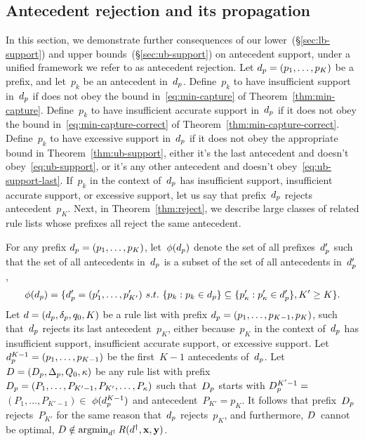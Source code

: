 \begin{arxiv}
\subsection{Antecedent rejection and its propagation}
\label{sec:reject}

In this section, we demonstrate further consequences of
our lower~(\S\ref{sec:lb-support}) and upper
bounds~(\S\ref{sec:ub-support}) on antecedent support,
under a unified framework we refer to as antecedent rejection.
%
Let ${d_p = (p_1, \dots, p_K)}$ be a prefix,
and let~$p_k$ be an antecedent in~$d_p$.
%
Define~$p_k$ to have insufficient support in~$d_p$
if does not obey the bound in~\eqref{eq:min-capture}
of Theorem~\ref{thm:min-capture}.
%
Define~$p_k$ to have insufficient accurate support in~$d_p$
if it does not obey the bound in~\eqref{eq:min-capture-correct}
of Theorem~\ref{thm:min-capture-correct}.
%
Define~$p_k$ to have excessive support in~$d_p$ if it
does not obey the appropriate bound in Theorem~\ref{thm:ub-support},
\ie either it's the last antecedent and doesn't obey~\eqref{eq:ub-support},
or it's any other antecedent and doesn't obey~\eqref{eq:ub-support-last}.
%
If~$p_k$ in the context of~$d_p$ has insufficient support,
insufficient accurate support, or excessive support,
let us say that prefix~$d_p$ rejects antecedent~$p_K$.
%
Next, in Theorem~\ref{thm:reject}, we describe large classes of
related rule lists whose prefixes all reject the same antecedent.

\begin{theorem}
\label{thm:reject}
For any prefix ${d_p = (p_1, \dots, p_K)}$,
let~$\phi(d_p)$ denote the set of all
prefixes~$d_p'$ such that
the set of all antecedents in~$d_p$ is a subset of
the set of all antecedents in~$d_p'$, \ie
\begin{align}
\phi(d_p) =
\{d_p' = (p'_1, \dots, p'_{K'})
~s.t.~ \{p_k : p_k \in d_p \} \subseteq
\{p'_\kappa : p'_\kappa \in d_p'\}, K' \ge K \}.
\label{eq:start-contains}
\end{align}
%
Let ${{d} = (d_p, \delta_p, q_0, K)}$ be a rule list
with prefix ${d_p = (p_1, \dots, p_{K-1}, p_{K})}$,
such that~$d_p$ rejects its last antecedent~$p_{K}$,
either because~$p_{K}$ in the context of~$d_p$ has
insufficient support, insufficient accurate support,
or excessive support.
%
Let ${d_p^{K-1} = (p_1, \dots, p_{K-1})}$ be the
first~${K - 1}$ antecedents of~$d_p$.
%
Let ${{D} = (D_p, \Delta_p, Q_0, \kappa)}$
be any rule list with prefix
${D_p = (P_1, \dots, P_{K'-1}, P_{K'}, \dots, P_{\kappa})}$
such that~$D_p$ starts with ${D_p^{K'-1} =}$
${(P_1, \dots, P_{K'-1}) \in}$ ${\phi(d_p^{K-1})}$
and antecedent~${P_{K'} = p_{K}}$.
%
It follows that prefix~$D_p$ rejects~$P_{K'}$
for the same reason that~$d_p$ rejects~$p_{K}$,
and furthermore, ${D}$~cannot be optimal, \ie
${{D} \notin \operatorname*{argmin}_{{d}^\dagger} R({d}^\dagger, \mathbf{x}, \mathbf{y})}$.
\end{theorem}


\end{arxiv}
